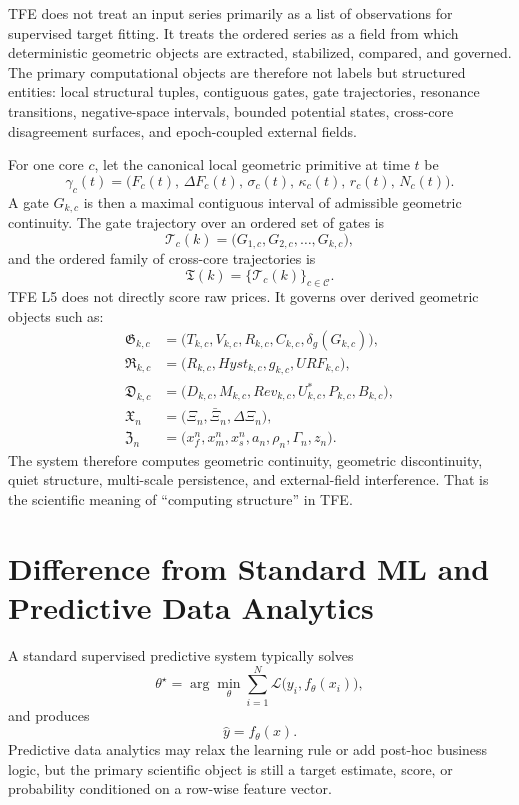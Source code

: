 TFE does not treat an input series primarily as a list of observations for supervised target fitting. It treats the ordered series as a field from which deterministic geometric objects are extracted, stabilized, compared, and governed. The primary computational objects are therefore not labels but structured entities: local structural tuples, contiguous gates, gate trajectories, resonance transitions, negative-space intervals, bounded potential states, cross-core disagreement surfaces, and epoch-coupled external fields.

For one core $c$, let the canonical local geometric primitive at time $t$ be
\[
\gamma_c(t)=\big(F_c(t),\,\Delta F_c(t),\,\sigma_c(t),\,\kappa_c(t),\,r_c(t),\,N_c(t)\big).
\]
A gate $G_{k,c}$ is then a maximal contiguous interval of admissible geometric continuity. The gate trajectory over an ordered set of gates is
\[
\mathcal{T}_{c}(k)=\big(G_{1,c},G_{2,c},\dots,G_{k,c}\big),
\]
and the ordered family of cross-core trajectories is
\[
\mathfrak{T}(k)=\{\mathcal{T}_{c}(k)\}_{c\in\mathcal{C}}.
\]
TFE L5 does not directly score raw prices. It governs over derived geometric objects such as:
\begin{align*}
\mathfrak{G}_{k,c} &= \big(T_{k,c},V_{k,c},R_{k,c},C_{k,c},\delta_g(G_{k,c})\big),\\
\mathfrak{R}_{k,c} &= \big(R_{k,c},Hyst_{k,c},g_{k,c},URF_{k,c}\big),\\
\mathfrak{D}_{k,c} &= \big(D_{k,c},M_{k,c},Rev_{k,c},U^{\ast}_{k,c},P_{k,c},B_{k,c}\big),\\
\mathfrak{X}_{n} &= \big(\Xi_n,\bar\Xi_n,\Delta\Xi_n\big),\\
\mathfrak{Z}_{n} &= \big(x_f^n,x_m^n,x_s^n,a_n,\rho_n,\Gamma_n,z_n\big).
\end{align*}
The system therefore computes geometric continuity, geometric discontinuity, quiet structure, multi-scale persistence, and external-field interference. That is the scientific meaning of ``computing structure'' in TFE.

\section{Difference from Standard ML and Predictive Data Analytics}

A standard supervised predictive system typically solves
\[
\theta^{\star}=\arg\min_{\theta}\sum_{i=1}^{N}\mathcal{L}\big(y_i, f_{\theta}(x_i)\big),
\]
and produces
\[
\hat y = f_{\theta}(x).
\]
Predictive data analytics may relax the learning rule or add post-hoc business logic, but the primary scientific object is still a target estimate, score, or probability conditioned on a row-wise feature vector.


